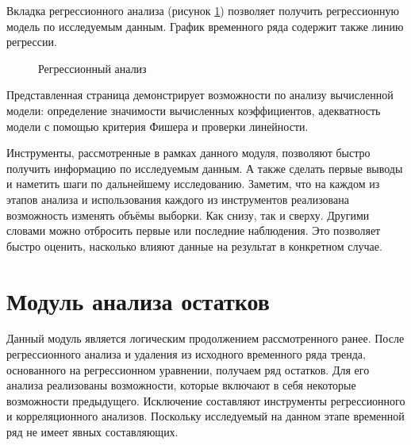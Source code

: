 Вкладка регрессионного анализа (рисунок \ref{img:mod_regr}) позволяет получить регрессионную модель по исследуемым данным. График временного ряда содержит также линию регрессии.
\begin{figure}[ht]
\caption{Регрессионный анализ}
\label{img:mod_regr}
\end{figure}
Представленная страница демонстрирует возможности по анализу вычисленной модели: определение значимости вычисленных коэффициентов, адекватность модели с помощью критерия Фишера и проверки линейности.

Инструменты, рассмотренные в рамках данного модуля, позволяют быстро получить информацию по исследуемым данным. А также сделать первые выводы и наметить шаги по дальнейшему исследованию. Заметим, что на каждом из этапов анализа и использования каждого из инструментов реализована возможность изменять объёмы выборки. Как снизу, так и сверху. Другими словами можно отбросить первые или последние наблюдения. Это позволяет быстро оценить, насколько влияют данные на результат в конкретном случае.


\section{Модуль анализа остатков} %
\label{sec:mod_residuals}

Данный модуль является логическим продолжением рассмотренного ранее. После регрессионного анализа и удаления из исходного временного ряда тренда, основанного на регрессионном уравнении, получаем ряд остатков. Для его анализа реализованы возможности, которые включают в себя некоторые возможности предыдущего. Исключение составляют инструменты регрессионного и корреляционного анализов. Поскольку исследуемый на данном этапе временной ряд не имеет явных составляющих.

